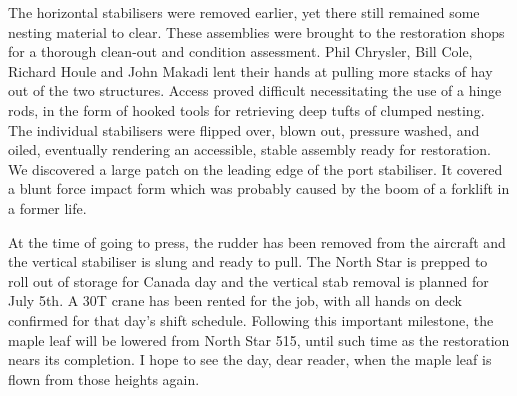 The horizontal stabilisers were removed earlier, yet there still remained some
nesting material to clear. These assemblies were brought to the restoration
shops for a thorough clean-out and condition assessment. Phil Chrysler, Bill
Cole,  Richard Houle and John Makadi lent their hands at pulling more stacks of
hay out of the two structures. Access proved difficult necessitating  the use of
a hinge rods, in the form of hooked tools for retrieving deep tufts of clumped
nesting. The individual stabilisers were flipped over, blown out, pressure
washed, and oiled, eventually rendering an accessible, stable assembly ready for
restoration. We discovered a large patch on the leading edge of the port
stabiliser. It covered a blunt force impact form which was probably caused by
the boom of a forklift in a former life. 

At the time of going to press, the rudder has been removed from the aircraft and
the vertical stabiliser is slung and ready to pull. The North Star is prepped to
roll out of storage for Canada day and the vertical stab removal is planned for
July 5th. A 30T crane has been rented for the job, with all hands on deck
confirmed for that day's shift schedule. Following this important milestone, the
maple leaf will be lowered from North Star 515, until such time as the
restoration nears its completion. I hope to see the day, dear reader, when the
maple leaf is flown from those heights again.  

